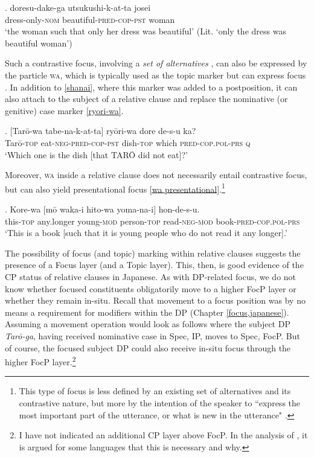 \documentclass [output=book,colorlinks,citecolor=brown]{langscibook}
\begin{document}
\exg. doresu-dake-ga utsukushi-k-at-ta josei\\
dress-only-\textsc{nom} beautiful-\textsc{pred-cop-pst} woman\\
`the woman such that only her dress was beautiful' (Lit. `only the dress was beautiful woman’) \label{doresudake}

Such a contrastive focus, involving a \textit{set of alternatives} \citep{zimmermann:2011:focus}, can also be expressed by the particle \textsc{wa}, which is typically used as the topic marker but can express focus \citep{vermeulen:2007:jap, vermeulen:2012:info}. In addition to \ref{shanai}, where this marker was added to a postposition, it can also attach to the subject of a relative clause and replace the nominative (or genitive) case marker \ref{ryori-wa}. %

\exg. [Tarō-wa tabe-na-k-at-ta] ryōri-wa dore de-s-u ka?\\
Tarō-\textsc{top} eat-\textsc{neg-pred-cop-pst} dish-\textsc{top} which \textsc{pred-cop.pol-prs} \textsc{q}\\
`Which one is the dish [that TARŌ did not eat]?’ \label{ryori-wa}

Moreover, \textsc{wa} inside a relative clause does not necessarily entail contrastive focus, but can also yield presentational focus \ref{wa presentational}.\footnote{This type of focus is less defined by an existing set of alternatives and its contrastive nature, but more by the intention of the speaker to ``express the most important part of the utterance, or what is new in the utterance" \citep[23]{krifka:2007:basic}.}

\exg. Kore-wa [mō waka-i hito-wa yoma-na-i] hon-de-s-u.\\
this-\textsc{top} any.longer young-\textsc{mod} person-\textsc{top} read-\textsc{neg-mod} book-\textsc{pred-cop.pol-prs}\\
`This is a book [such that it is young people who do not read it any longer].’ \label{wa presentational}

The possibility of focus (and topic) marking within relative clauses suggests the presence of a Focus layer (and a Topic layer). This, then, is good evidence of the CP status of relative clauses in Japanese. As with DP-related focus, we do not know whether focused constituents obligatorily move to a higher FocP layer or whether they remain in-situ. Recall that movement to a focus position was by no means a requirement for modifiers within the DP (Chapter \ref{focus,japanese}). Assuming a movement operation would look as follows where the subject DP \textit{Tarō-ga}, having received nominative case in Spec, IP, moves to Spec, FocP. But of course, the focused subject DP could also receive in-situ focus through the higher FocP layer.\footnote{I have not indicated an additional CP layer above FocP. In the analysis of \citep[57–65]{cinque:2020:relcl}, it is argued for some languages that this is necessary and why.} %
\end{document}
